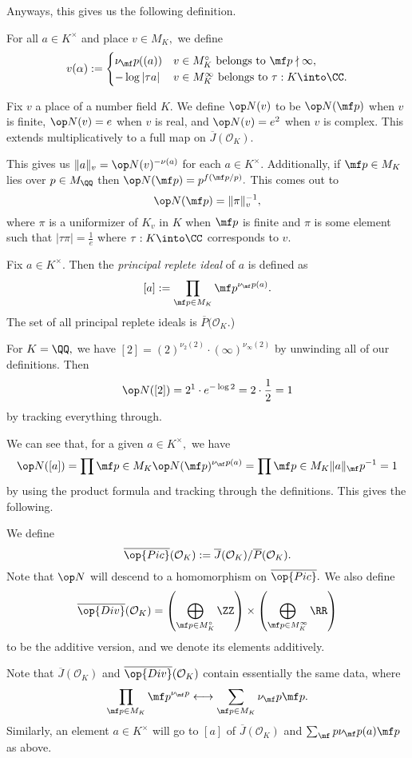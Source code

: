 \documentclass[../notes.tex]{subfiles}
\begin{document}
Anyways, this gives us the following definition.
\begin{definition}
	For all $a\in K^\times$ and place $v\in M_K,$ we define
	\[v(\alpha):=\begin{cases}
		\nu_\mf p((a)) & v\in M_K^\circ\text{ belongs to }\mf p\nmid\infty, \\
		-\log|\tau a| & v\in M_K^\infty\text{ belongs to }\tau:K\into\CC.
	\end{cases}\]
\end{definition}
\begin{definition}
	Fix $v$ a place of a number field $K.$ We define $\op N(v)$ to be $\op N(\mf p)$ when $v$ is finite, $\op N(v)=e$ when $v$ is real, and $\op N(v)=e^2$ when $v$ is complex. This extends multiplicatively to a full map on $\overline J(\mathcal O_K).$
\end{definition}
This gives us $\lVert a\rVert_v=\op N(v)^{-\nu(a)}$ for each $a\in K^\times.$\todo{} Additionally, if $\mf p\in M_K$ lies over $p\in M_\QQ$ then $\op N(\mf p)=p^{f(\mf p/p)}.$ This comes out to
\[\op N(\mf p)=\lVert\pi\rVert_v^{-1},\]
where $\pi$ is a uniformizer of $K_v$ in $K$ when $\mf p$ is finite and $\pi$ is some element such that $|\tau\pi|=\frac1e$ where $\tau:K\into\CC$ corresponds to $v.$
\begin{definition}
	Fix $a\in K^\times.$ Then the \textit{principal replete ideal} of $a$ is defined as
	\[[a]:=\prod_{\mf p\in M_K}\mf p^{\nu_\mf p(a)}.\]
	The set of all principal replete ideals is $\overline P(\mathcal O_K.$)
\end{definition}
\begin{example}
	For $K=\QQ,$ we have $[2]=(2)^{\nu_2(2)}\cdot(\infty)^{\nu_\infty(2)}$ by unwinding all of our definitions. Then
	\[\op N([2])=2^1\cdot e^{-\log2}=2\cdot\frac12=1\]
	by tracking everything through.
\end{example}
We can see that, for a given $a\in K^\times,$ we have
\[\op N([a])=\prod{\mf p\in M_K}\op N(\mf p)^{\nu_\mf p(a)}=\prod{\mf p\in M_K}\lVert a\rVert_\mf p^{-1}=1\]
by using the product formula and tracking through the definitions. This gives the following.
\begin{definition}
	We define
	\[\overline{\op{Pic}}(\mathcal O_K):=\overline J(\mathcal O_K)/\overline P(\mathcal O_K).\]
	Note that $\op N$ will descend to a homomorphism on $\overline{\op{Pic}}.$ We also define
	\[\overline{\op{Div}}(\mathcal O_K)=\left(\bigoplus_{\mf p\in M_K^\circ}\ZZ\right)\times\left(\bigoplus_{\mf p\in M_K^\infty}\RR\right)\]
	to be the additive version, and we denote its elements additively.
\end{definition}
Note that $\overline{J}(\mathcal O_K)$ and $\overline{\op{Div}}(\mathcal O_K)$ contain essentially the same data, where
\[\prod_{\mf p\in M_K}\mf p^{\nu_\mf p}\longleftrightarrow\sum_{\mf p\in M_K}\nu_\mf p\mf p.\]
Similarly, an element $a\in K^\times$ will go to $[a]$ of $\overline J(\mathcal O_K)$ and $\sum_\mf p\nu_\mf p(a)\mf p$ as above.
\end{document}
